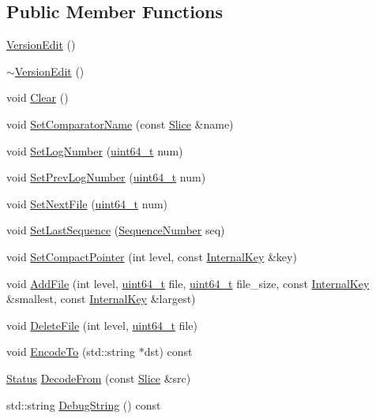 \subsection*{Public Member Functions}
\begin{DoxyCompactItemize}
\item 
\hyperlink{classleveldb_1_1_version_edit_a60dd9c72d256ed1bda68597a9263333e}{Version\+Edit} ()
\item 
\hyperlink{classleveldb_1_1_version_edit_a8863bc7fa645c4bc2518910429447fbe}{$\sim$\+Version\+Edit} ()
\item 
void \hyperlink{classleveldb_1_1_version_edit_a259c9de14d58e231178904c1559e4b5e}{Clear} ()
\item 
void \hyperlink{classleveldb_1_1_version_edit_ab562147cdd82b184e86e88bd375a718c}{Set\+Comparator\+Name} (const \hyperlink{classleveldb_1_1_slice}{Slice} \&name)
\item 
void \hyperlink{classleveldb_1_1_version_edit_a47e5c58d34b0e27dc8990687e0c5477a}{Set\+Log\+Number} (\hyperlink{stdint_8h_aaa5d1cd013383c889537491c3cfd9aad}{uint64\+\_\+t} num)
\item 
void \hyperlink{classleveldb_1_1_version_edit_ac1b5689f62e7a8f63c4eefa437a4f2f3}{Set\+Prev\+Log\+Number} (\hyperlink{stdint_8h_aaa5d1cd013383c889537491c3cfd9aad}{uint64\+\_\+t} num)
\item 
void \hyperlink{classleveldb_1_1_version_edit_a4c104515adf573be0ead29e6835f14fb}{Set\+Next\+File} (\hyperlink{stdint_8h_aaa5d1cd013383c889537491c3cfd9aad}{uint64\+\_\+t} num)
\item 
void \hyperlink{classleveldb_1_1_version_edit_abd6e841ed400672d33d26f4b187a66bf}{Set\+Last\+Sequence} (\hyperlink{namespaceleveldb_a5481ededd221c36d652c371249f869fa}{Sequence\+Number} seq)
\item 
void \hyperlink{classleveldb_1_1_version_edit_ac9b26dfba1188705d7fc4deaf047271c}{Set\+Compact\+Pointer} (int level, const \hyperlink{classleveldb_1_1_internal_key}{Internal\+Key} \&key)
\item 
void \hyperlink{classleveldb_1_1_version_edit_a4cd5cc92761b7ae5b5f9cff46cb88263}{Add\+File} (int level, \hyperlink{stdint_8h_aaa5d1cd013383c889537491c3cfd9aad}{uint64\+\_\+t} file, \hyperlink{stdint_8h_aaa5d1cd013383c889537491c3cfd9aad}{uint64\+\_\+t} file\+\_\+size, const \hyperlink{classleveldb_1_1_internal_key}{Internal\+Key} \&smallest, const \hyperlink{classleveldb_1_1_internal_key}{Internal\+Key} \&largest)
\item 
void \hyperlink{classleveldb_1_1_version_edit_ac222bfd1055114d57aadbd124f24ad0c}{Delete\+File} (int level, \hyperlink{stdint_8h_aaa5d1cd013383c889537491c3cfd9aad}{uint64\+\_\+t} file)
\item 
void \hyperlink{classleveldb_1_1_version_edit_aa3161c67223f6c5e843be579a8456086}{Encode\+To} (std\+::string $\ast$dst) const 
\item 
\hyperlink{classleveldb_1_1_status}{Status} \hyperlink{classleveldb_1_1_version_edit_ac0f431c5e8f08c74c697d8480f7c005f}{Decode\+From} (const \hyperlink{classleveldb_1_1_slice}{Slice} \&src)
\item 
std\+::string \hyperlink{classleveldb_1_1_version_edit_aa186529f0124867251964b2346b58b1f}{Debug\+String} () const 
\end{DoxyCompactItemize}
